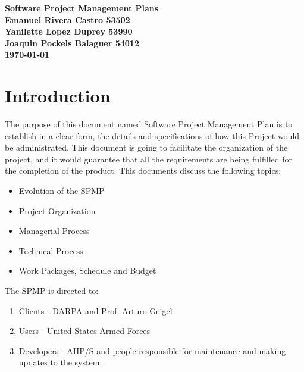 \documentclass[12pt]{article}
\begin{document}
\begin{titlepage}
 \centering
    \vspace*{15\baselineskip}
    \large
    \bfseries
    Software Project Management Plans  \\[3\baselineskip]
    \normalfont
     \vfill
    Emanuel Rivera Castro 53502 \\
    Yanilette Lopez Duprey 53990\\
    Joaquin Pockels Balaguer 54012\\[2\baselineskip]

    \textbf{\today} \\[2\baselineskip]
\end{titlepage}

\tableofcontents
\pagebreak
\listoftables
\pagebreak
\listoffigures
\clearpage{}

\section{Introduction}
 The purpose of this document named Software Project Management Plan is to establish in a clear form, the details and specifications of how this Project would be administrated. This document is going to facilitate the organization of the project, and it would guarantee that all the requirements are being fulfilled for the completion of the product.  This documents discuss the following topics:
\begin{itemize}
  \item Evolution of the SPMP 
  \item Project Organization
  \item Managerial Process
  \item Technical Process
  \item Work Packages, Schedule and Budget
\end{itemize}
The SPMP is directed to:
\begin{enumerate}
  \item Clients - DARPA and Prof. Arturo Geigel
  \item Users - United States Armed Forces
  \item Developers - AIIP/S and people responsible for maintenance and making updates to the system.
\end{enumerate}
\end{document}
